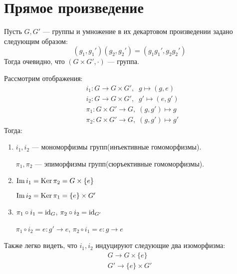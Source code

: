 \documentclass[../main.tex]{subfiles}
\begin{document}
\section{Прямое произведение}
Пусть $G, G'$ --- группы и умножение в их декартовом произведении задано следующим образом:
\begin{equation*}
  (g_1, g_1')(g_2, g_2') = (g_1g_1', g_2g_2')
\end{equation*}
Тогда очевидно, что $(G \times G', \cdot)$ --- группа.
\begin{theorem-non}
  Рассмотрим отображения:
  \begin{align*}
    &i_1\colon G \to G \times G', \;\; g \mapsto (g, e) \\
    &i_2\colon G \to G \times G', \;\; g' \mapsto (e, g')\\
    &\pi_1\colon G \times G' \to G, \; (g, g') \mapsto g \\
    &\pi_2\colon G \times G' \to G, \; (g, g') \mapsto g'
  \end{align*}
  Тогда:
  \begin{enumerate}
    \item $i_1, i_2$ --- мономорфизмы групп(инъективные гомоморфизмы).

    $\pi_1, \pi_2$ --- эпиморфизмы групп(сюръективные гомоморфизмы).

    \item $\operatorname{Im} i_1 = \operatorname{Ker} \pi_2 = G \times \{e\}$

    $\operatorname{Im} i_2 = \operatorname{Ker} \pi_1 = \{e\} \times G'$

    \item $\pi_1 \circ i_1 = \operatorname{id}_G$, \quad $\pi_2 \circ i_2 = \operatorname{id}_{G'}$

    $\pi_1 \circ i_2 = e\colon g' \to e$, \quad $\pi_2 \circ i_1 = e\colon g \to e$
  \end{enumerate}
  Также легко видеть, что $i_1, i_2$ индуцируют следующие два изоморфизма:
  \begin{equation*}
    \begin{gathered}
      G \to G \times \{e\} \\
      G' \to \{e\} \times G'
    \end{gathered}
  \end{equation*}
\end{theorem-non}
\end{document}
